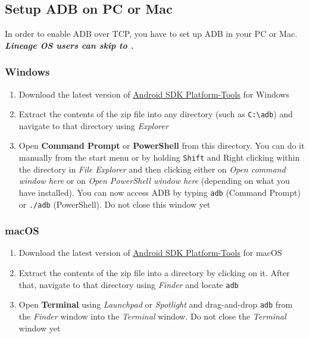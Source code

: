 \subsection{Setup ADB on PC or Mac}\label{subsec:setup-adb-on-pc-or-mac}
In order to enable ADB over TCP, you have to set up ADB in your PC or Mac. \textbf{\textit{Lineage OS users can skip to
.}}

\subsubsection{Windows}
\begin{enumerate}
    \item Download the latest version of
    \href{https://dl.google.com/android/repository/platform-tools-latest-windows.zip}{Android SDK Platform-Tools} for
    Windows
    \item Extract the contents of the zip file into any directory (such as \texttt{C:\textbackslash{adb}}) and navigate
    to that directory using \textit{Explorer}
    \item Open \textbf{Command Prompt} or \textbf{PowerShell} from this directory. You can do it manually from the start
    menu or by holding \texttt{Shift} and Right clicking within the directory in \textit{File Explorer} and then
    clicking either on \textit{Open command window here} or on \textit{Open PowerShell window here} (depending on
    what you have installed). You can now access ADB by typing \texttt{adb} (Command Prompt) or \texttt{./adb}
    (PowerShell). Do not close this window yet
\end{enumerate}

\subsubsection{macOS}
\begin{enumerate}
    \item Download the latest version of
    \href{https://dl.google.com/android/repository/platform-tools-latest-darwin.zip}{Android SDK Platform-Tools} for
    macOS
    \item Extract the contents of the zip file into a directory by clicking on it. After that, navigate to that
    directory using \textit{Finder} and locate \texttt{adb}
    \item Open \textbf{Terminal} using \textit{Launchpad} or \textit{Spotlight} and drag-and-drop \texttt{adb} from the
    \textit{Finder} window into the \textit{Terminal} window. Do not close the \textit{Terminal} window yet
\end{enumerate}

